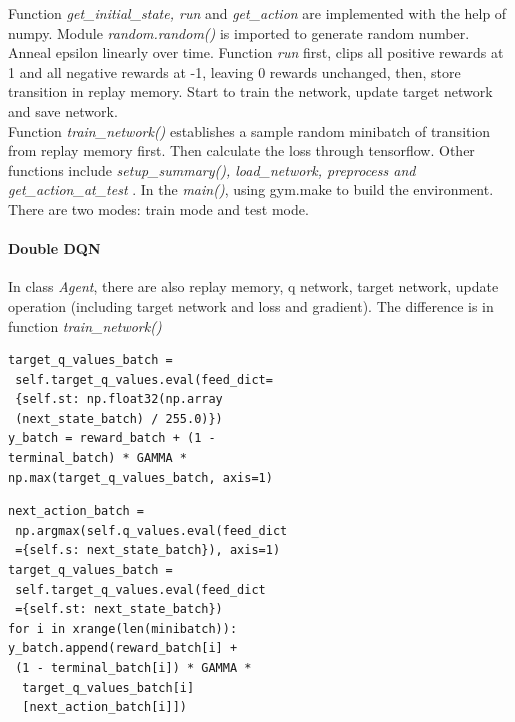 \documentclass[10pt,twocolumn,letterpaper]{article}
\begin{document}
Function \emph{get\_initial\_state, run} and \emph{get\_action} are implemented with the help of numpy. Module \emph{random.random()} is imported to generate random number. Anneal epsilon linearly over time. Function \emph{run} first, clips all positive rewards at 1 and all negative rewards at -1, leaving 0 rewards unchanged, then, store transition in replay memory. Start to train the network, update target network and save network.\\
Function \emph{train\_network()} establishes a sample random minibatch of transition from replay memory first. Then calculate the loss through tensorflow. Other functions include \emph{setup\_summary(), load\_network, preprocess and get\_action\_at\_test }. In the \emph{main()}, using gym.make to build the environment. There are two modes: train mode and test mode.
\paragraph{Double DQN}
In class \emph{Agent}, there are also replay memory, q network, target network, update operation (including target network and loss and gradient). The difference is in function \emph{train\_network()}
\begin{lstlisting}[title=dqn.py, frame=shadowbox]
target_q_values_batch =
 self.target_q_values.eval(feed_dict=
 {self.st: np.float32(np.array
 (next_state_batch) / 255.0)})
y_batch = reward_batch + (1 - 
terminal_batch) * GAMMA * 
np.max(target_q_values_batch, axis=1)
\end{lstlisting}

\begin{lstlisting}[title=ddqn.py, frame=shadowbox]
next_action_batch =
 np.argmax(self.q_values.eval(feed_dict
 ={self.s: next_state_batch}), axis=1)
target_q_values_batch =
 self.target_q_values.eval(feed_dict
 ={self.st: next_state_batch})
for i in xrange(len(minibatch)):
y_batch.append(reward_batch[i] +
 (1 - terminal_batch[i]) * GAMMA *
  target_q_values_batch[i]
  [next_action_batch[i]])
\end{lstlisting}
 
\end{document}

